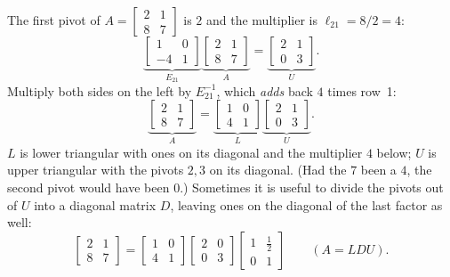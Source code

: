\begin{example}\label{ex:u05-LU2}
The first pivot of $A=\begin{bmatrix} 2 & 1\\ 8 & 7\end{bmatrix}$
is $2$ and the multiplier is $\ell_{21}=8/2=4$:
\[
  \underbrace{\begin{bmatrix} 1 & 0\\ -4 & 1\end{bmatrix}}_{E_{21}}
  \underbrace{\begin{bmatrix} 2 & 1\\ 8 & 7\end{bmatrix}}_{A}
  =\underbrace{\begin{bmatrix} 2 & 1\\ 0 & 3\end{bmatrix}}_{U}.
\]
Multiply both sides on the left by $E_{21}^{-1}$, which \emph{adds} back $4$ times row~1:
\[
  \underbrace{\begin{bmatrix} 2 & 1\\ 8 & 7\end{bmatrix}}_{A}
  =\underbrace{\begin{bmatrix} 1 & 0\\ 4 & 1\end{bmatrix}}_{L}
  \underbrace{\begin{bmatrix} 2 & 1\\ 0 & 3\end{bmatrix}}_{U}.
\]
$L$ is lower triangular with ones on its diagonal and the multiplier $4$ below; $U$ is upper
triangular with the pivots $2,3$ on its diagonal. (Had the $7$ been a $4$, the second pivot
would have been $0$.) Sometimes it is useful to divide the pivots out of $U$ into a diagonal
matrix $D$, leaving ones on the diagonal of the last factor as well:
\[
  \begin{bmatrix} 2 & 1\\ 8 & 7\end{bmatrix}
  =\begin{bmatrix} 1 & 0\\ 4 & 1\end{bmatrix}
  \begin{bmatrix} 2 & 0\\ 0 & 3\end{bmatrix}
  \begin{bmatrix} 1 & \tfrac12\\ 0 & 1\end{bmatrix}
  \qquad (A=LDU).
\]
\end{example}

